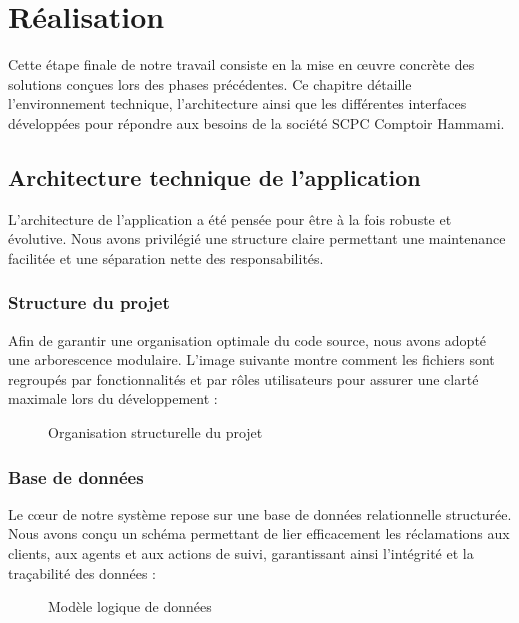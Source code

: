 \chapter{Réalisation}

Cette étape finale de notre travail consiste en la mise en œuvre concrète des solutions conçues lors des phases précédentes. Ce chapitre détaille l'environnement technique, l'architecture ainsi que les différentes interfaces développées pour répondre aux besoins de la société SCPC Comptoir Hammami.

\section{Architecture technique de l'application}
L'architecture de l'application a été pensée pour être à la fois robuste et évolutive. Nous avons privilégié une structure claire permettant une maintenance facilitée et une séparation nette des responsabilités.

\subsection{Structure du projet}
Afin de garantir une organisation optimale du code source, nous avons adopté une arborescence modulaire. L'image suivante montre comment les fichiers sont regroupés par fonctionnalités et par rôles utilisateurs pour assurer une clarté maximale lors du développement :

\begin{figure}[H]
    \centering
    \caption{Organisation structurelle du projet}
    \label{fig:arborescence}
\end{figure}

\subsection{Base de données}
Le cœur de notre système repose sur une base de données relationnelle structurée. Nous avons conçu un schéma permettant de lier efficacement les réclamations aux clients, aux agents et aux actions de suivi, garantissant ainsi l'intégrité et la traçabilité des données :

\begin{figure}[H]
    \centering
    \caption{Modèle logique de données}
    \label{fig:database_schema}
\end{figure}

